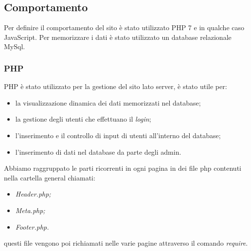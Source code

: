 \subsection{Comportamento}
Per definire il comportamento del sito è stato utilizzato PHP 7 e in qualche caso JavaScript. \newline
Per memorizzare i dati è stato utilizzato un database relazionale MySql.
\subsubsection{PHP}
PHP è stato utilizzato per la gestione del sito lato server, è stato utile per: 
\begin{itemize}
    \item la visualizzazione dinamica dei dati memorizzati nel database;
    \item la gestione degli utenti che effettuano il \emph{login};
    \item l'inserimento e il controllo di input di utenti all'interno del database;
    \item l'inserimento di dati nel database da parte degli admin.
\end{itemize}
Abbiamo raggruppato le parti ricorrenti in ogni pagina in dei file php contenuti nella cartella general chiamati:
\begin{itemize}
	\item \textit{Header.php;}
	\item \textit{Meta.php;}
	\item \textit{Footer.php.}
\end{itemize}
questi file vengono poi richiamati nelle varie pagine attraverso il comando \emph{require}.\newline

